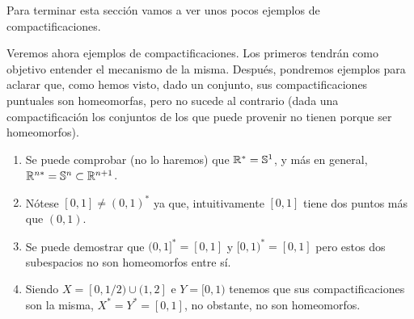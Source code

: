 Para terminar esta sección vamos a ver unos pocos ejemplos de compactificaciones.
\begin{exa}[Miscelánea]
	Veremos ahora ejemplos de compactificaciones. Los primeros tendrán como objetivo entender el mecanismo de la misma. Después, pondremos ejemplos para aclarar que, como hemos visto, dado un conjunto, sus compactificaciones puntuales son homeomorfas, pero no sucede al contrario (dada una compactificación los conjuntos de los que puede provenir no tienen porque ser homeomorfos). 
	\begin{enumerate}
		\item Se puede comprobar (no lo haremos) que $\mathbb{R}^*=\mathbb{S}^1$, y más en general, $\mathbb{R}^{n*}=\mathbb{S}^n\subset \mathbb{R}^{n+1}$.
		\item Nótese $[0,1]\not=(0,1)^*$ ya que, intuitivamente $[0,1]$ tiene dos puntos más que $(0,1)$.
		\item Se puede demostrar que $(0,1]^*=[0,1]$ y $[0,1)^*=[0,1]$ pero estos dos subespacios no son homeomorfos entre sí.
		\item Siendo $X=[0,1/2)\cup(1,2]$ e $Y=[0,1)$ tenemos que sus compactificaciones son la misma, $X^*=Y^*=[0,1]$, no obstante, no son homeomorfos.\qedhere
	\end{enumerate}
\end{exa}

